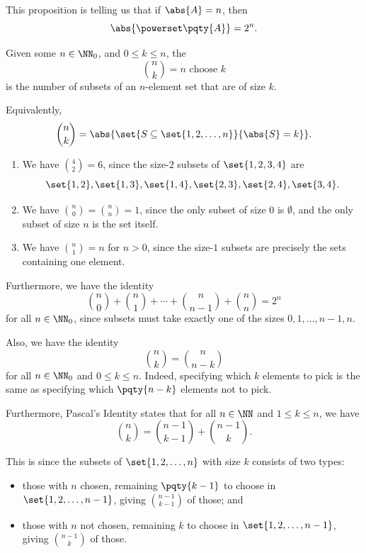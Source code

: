 This proposition is telling us that if \(\abs{A} = n\), then
\[
    \abs{\powerset\pqty{A}} = 2^n.
\]

\begin{definition}
    Given some \(n \in \NN_0\), and \(0 \leq k \leq n\), the 
    \[
        \binom{n}{k} = n \text{ choose } k
    \]
    is the number of subsets of an \(n\)-element set that are of size \(k\).

    Equivalently,
    \[
        \binom{n}{k} = \abs{\set{S \subseteq \set{1, 2, \ldots, n}}{\abs{S} = k}}.
    \]
\end{definition}

\begin{examples}
    \begin{enumerate}
        \item We have \(\binom{4}{2} = 6\), since the size-\(2\) subsets of \(\set{1, 2, 3, 4}\) are
        \[
            \set{1, 2}, \set{1, 3}, \set{1, 4}, \set{2, 3}, \set{2, 4}, \set{3, 4}.
        \]

        \item We have \(\binom{n}{0} = \binom{n}{n} = 1\), since the only subset of size \(0\) is \(\emptyset\), and the only subset of size \(n\) is the set itself.
        \item We have \(\binom{n}{1} = n\) for \(n > 0\), since the size-\(1\) subsets are precisely the sets containing one element.
    \end{enumerate}
\end{examples}

Furthermore, we have the identity
\[
    \binom{n}{0} + \binom{n}{1} + \cdots + \binom{n}{n - 1} + \binom{n}{n} = 2^n
\]
for all \(n \in \NN_0\), since subsets must take exactly one of the sizes \(0, 1, \ldots, n - 1, n\).

Also, we have the identity
\[
    \binom{n}{k} = \binom{n}{n - k}
\]
for all \(n \in \NN_0\) and \(0 \leq k \leq n\). Indeed, specifying which \(k\) elements to pick is the same as specifying which \(\pqty{n - k}\) elements not to pick.

Furthermore, Pascal's Identity states that for all \(n \in \NN\) and \(1 \leq k \leq n\), we have
\[
    \binom{n}{k} = \binom{n - 1}{k - 1} + \binom{n - 1}{k}.
\]

This is since the subsets of \(\set{1, 2, \ldots, n}\) with size \(k\) consists of two types:
\begin{itemize}
    \item those with \(n\) chosen, remaining \(\pqty{k - 1}\) to choose in \(\set{1, 2, \ldots, n - 1}\), giving \(\binom{n - 1}{k - 1}\) of those; and
    \item those with \(n\) not chosen, remaining \(k\) to choose in \(\set{1, 2, \ldots, n - 1}\), giving \(\binom{n - 1}{k}\) of those.
\end{itemize}

